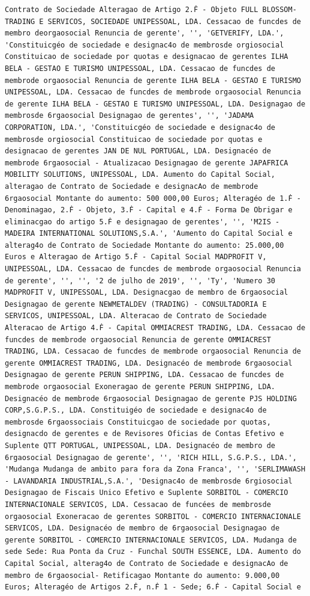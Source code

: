 \documentclass[
  12pt,
]{article}
\begin{document}
\begin{verbatim}
Contrato de Sociedade Alteragao de Artigo 2.Ḟ - Objeto FULL BLOSSOM- TRADING E SERVICOS, SOCIEDADE UNIPESSOAL, LDA. Cessacao de funcdes de membro deorgaosocial Renuncia de gerente', '', 'GETVERIFY, LDA.', 'Constituicgéo de sociedade e designac4o de membrosde orgiosocial Constituicao de sociedade por quotas e designacao de gerentes ILHA BELA - GESTAO E TURISMO UNIPESSOAL, LDA. Cessacao de funcdes de membrode orgaosocial Renuncia de gerente ILHA BELA - GESTAO E TURISMO UNIPESSOAL, LDA. Cessacao de funcdes de membrode orgaosocial Renuncia de gerente ILHA BELA - GESTAO E TURISMO UNIPESSOAL, LDA. Designagao de membrosde 6rgaosocial Designagao de gerentes', '', 'JADAMA CORPORATION, LDA.', 'Constituicgéo de sociedade e designac4o de membrosde orgiosocial Constituicao de sociedade por quotas e designacao de gerentes JAN DE NUL PORTUGAL, LDA. Designacéo de membrode 6rgaosocial - Atualizacao Designagao de gerente JAPAFRICA MOBILITY SOLUTIONS, UNIPESSOAL, LDA. Aumento do Capital Social, alteragao de Contrato de Sociedade e designacAo de membrode 6rgaosocial Montante do aumento: 500 000,00 Euros; Alteragéo de 1.Ḟ - Denominagao, 2.Ḟ - Objeto, 3.Ḟ - Capital e 4.Ḟ - Forma De Obrigar e eliminacgao do artigo 5.Ḟ e designagao de gerentes', '', 'M2IS - MADEIRA INTERNATIONAL SOLUTIONS,S.A.', 'Aumento do Capital Social e alterag4o de Contrato de Sociedade Montante do aumento: 25.000,00 Euros e Alteragao de Artigo 5.Ḟ - Capital Social MADPROFIT V, UNIPESSOAL, LDA. Cessacao de funcdes de membrode orgaosocial Renuncia de gerente', '', '', '2 de julho de 2019', '', 'Ty', 'Numero 30 MADPROFIT V, UNIPESSOAL, LDA. Designacgao de membro de 6rgaosocial Designagao de gerente NEWMETALDEV (TRADING) - CONSULTADORIA E SERVICOS, UNIPESSOAL, LDA. Alteracao de Contrato de Sociedade Alteracao de Artigo 4.Ḟ - Capital OMMIACREST TRADING, LDA. Cessacao de funcdes de membrode orgaosocial Renuncia de gerente OMMIACREST TRADING, LDA. Cessacao de funcdes de membrode orgaosocial Renuncia de gerente OMMIACREST TRADING, LDA. Designacéo de membrode 6rgaosocial Designagao de gerente PERUN SHIPPING, LDA. Cessacao de funcdes de membrode orgaosocial Exoneragao de gerente PERUN SHIPPING, LDA. Designacéo de membrode 6rgaosocial Designagao de gerente PJS HOLDING CORP,S.G.P.S., LDA. Constituigéo de sociedade e designac4o de membrosde 6rgaossociais Constituicgao de sociedade por quotas, designacdo de gerentes e de Revisores Oficias de Contas Efetivo e Suplente QTT PORTUGAL, UNIPESSOAL, LDA. Designacéo de membro de 6rgaosocial Designagao de gerente', '', 'RICH HILL, S.G.P.S., LDA.', 'Mudanga Mudanga de ambito para fora da Zona Franca', '', 'SERLIMAWASH - LAVANDARIA INDUSTRIAL,S.A.', 'Designac4o de membrosde 6rgiosocial Designagao de Fiscais Unico Efetivo e Suplente SORBITOL - COMERCIO INTERNACIONALE SERVICOS, LDA. Cessacao de funcées de membrosde orgaosocial Exoneracao de gerentes SORBITOL - COMERCIO INTERNACIONALE SERVICOS, LDA. Designacéo de membro de 6rgaosocial Designagao de gerente SORBITOL - COMERCIO INTERNACIONALE SERVICOS, LDA. Mudanga de sede Sede: Rua Ponta da Cruz - Funchal SOUTH ESSENCE, LDA. Aumento do Capital Social, alterag4o de Contrato de Sociedade e designacAo de membro de 6rgaosocial- Retificagao Montante do aumento: 9.000,00 Euros; Alteragéo de Artigos 2.Ḟ, n.Ḟ 1 - Sede; 6.Ḟ - Capital Social e 
\end{verbatim}
\end{document}
